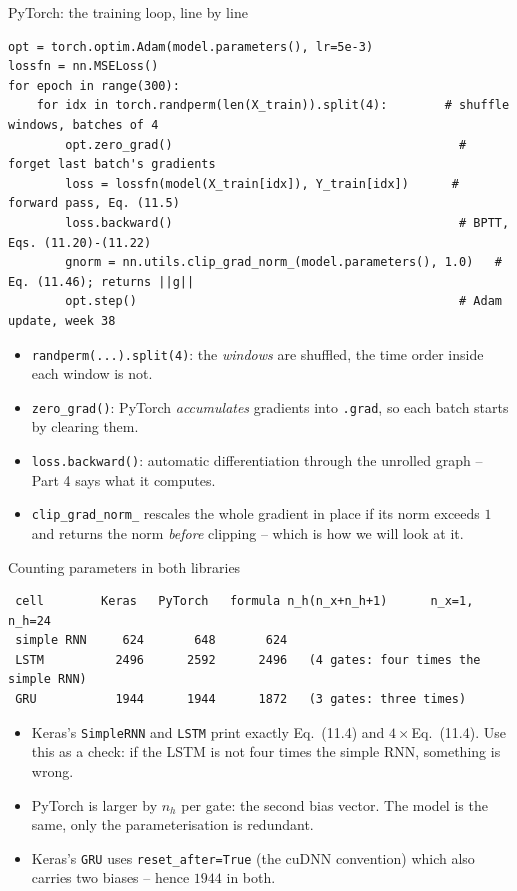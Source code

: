 \documentclass[10pt,aspectratio=169]{beamer}
\begin{document}
\begin{frame}[fragile]{PyTorch: the training loop, line by line}
\begin{lstlisting}
opt = torch.optim.Adam(model.parameters(), lr=5e-3)
lossfn = nn.MSELoss()
for epoch in range(300):
    for idx in torch.randperm(len(X_train)).split(4):        # shuffle windows, batches of 4
        opt.zero_grad()                                        # forget last batch's gradients
        loss = lossfn(model(X_train[idx]), Y_train[idx])      # forward pass, Eq. (11.5)
        loss.backward()                                        # BPTT, Eqs. (11.20)-(11.22)
        gnorm = nn.utils.clip_grad_norm_(model.parameters(), 1.0)   # Eq. (11.46); returns ||g||
        opt.step()                                             # Adam update, week 38
\end{lstlisting}
\small
\begin{itemize}
  \item \texttt{randperm(...).split(4)}: the \emph{windows} are shuffled,
        the time order inside each window is not.
  \item \texttt{zero\_grad()}: PyTorch \emph{accumulates} gradients into
        \texttt{.grad}, so each batch starts by clearing them.
  \item \texttt{loss.backward()}: automatic differentiation through the
        unrolled graph -- Part 4 says what it computes.
  \item \texttt{clip\_grad\_norm\_} rescales the whole gradient in place if
        its norm exceeds $1$ and returns the norm \emph{before} clipping --
        which is how we will look at it.
\end{itemize}
\end{frame}

\begin{frame}[fragile]{Counting parameters in both libraries}
\begin{lstlisting}
 cell        Keras   PyTorch   formula n_h(n_x+n_h+1)      n_x=1, n_h=24
 simple RNN     624       648       624
 LSTM          2496      2592      2496   (4 gates: four times the simple RNN)
 GRU           1944      1944      1872   (3 gates: three times)
\end{lstlisting}
\small
\begin{itemize}
  \item Keras's \texttt{SimpleRNN} and \texttt{LSTM} print exactly
        Eq.~(11.4) and $4\times$Eq.~(11.4).  Use this as a check: if the LSTM
        is not four times the simple RNN, something is wrong.
  \item PyTorch is larger by $n_h$ per gate: the second bias vector.  The
        model is the same, only the parameterisation is redundant.
  \item Keras's \texttt{GRU} uses \texttt{reset\_after=True} (the cuDNN
        convention) which also carries two biases -- hence $1944$ in both.
\end{itemize}
\end{frame}
\end{document}
